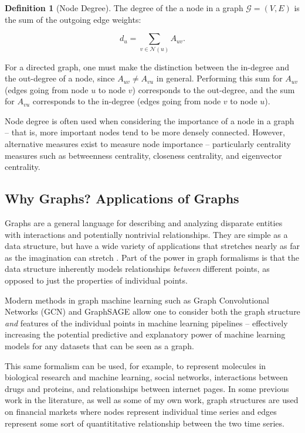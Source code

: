 \documentclass[12pt]{article}
\theoremstyle{definition}
\newtheorem{definition}{Definition}[section]
\begin{document}
\begin{definition}[Node Degree]
The degree of the a node in a graph $\mathcal{G} = (V, E)$ is the sum of the outgoing edge weights:

\[
d_u = \sum_{v \in \mathcal{N}(u)} A_{uv}.
\]

For a directed graph, one must make the distinction between the in-degree and the out-degree of a node, since $A_{uv} \neq A_{vu}$ in general. Performing this sum for $A_{uv}$ (edges going from node $u$ to node $v$) corresponds to the out-degree, and the sum for $A_{vu}$ corresponds to the in-degree (edges going from node $v$ to node $u$).
\end{definition}

Node degree is often used when considering the importance of a node in a graph -- that is, more important nodes tend to be more densely connected. However, alternative measures exist to measure node importance -- particularly centrality measures such as betweenness centrality, closeness centrality, and eigenvector centrality. 

\subsection{Why Graphs? Applications of Graphs}
\label{subsec:motivation}

Graphs are a general language for describing and analyzing disparate entities with interactions and potentially nontrivial relationships. They are simple as a data structure, but have a wide variety of applications that stretches nearly as far as the imagination can stretch \cite{hamiltonGRL}. Part of the power in graph formalisms is that the data structure inherently models relationships \textit{between} different points, as opposed to just the properties of individual points. 

Modern methods in graph machine learning such as Graph Convolutional Networks (GCN) \cite{GCNPaper} and GraphSAGE \cite{graphSAGE} allow one to consider both the graph structure \textit{and} features of the individual points in machine learning pipelines -- effectively increasing the potential predictive and explanatory power of machine learning models for any datasets that can be seen as a graph. 

This same formalism can be used, for example, to represent molecules in biological research and machine learning, social networks, interactions between drugs and proteins, and relationships between internet pages. In some previous work in the literature, as well as some of my own work, graph structures are used on financial markets where nodes represent individual time series and edges represent some sort of quantititative relationship between the two time series.
\end{document}
